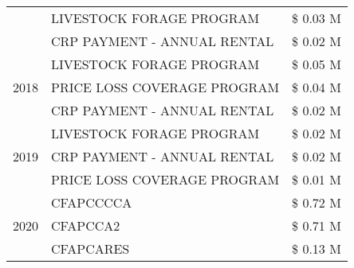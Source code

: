 \begin{tabular}{llr}
 & LIVESTOCK FORAGE PROGRAM & \$ 0.03 M \\
 & CRP PAYMENT - ANNUAL RENTAL & \$ 0.02 M \\
\cline{1-3}
\multirow[t]{3}{*}{2018} & LIVESTOCK FORAGE PROGRAM & \$ 0.05 M \\
 & PRICE LOSS COVERAGE PROGRAM & \$ 0.04 M \\
 & CRP PAYMENT - ANNUAL RENTAL & \$ 0.02 M \\
\cline{1-3}
\multirow[t]{3}{*}{2019} & LIVESTOCK FORAGE PROGRAM & \$ 0.02 M \\
 & CRP PAYMENT - ANNUAL RENTAL & \$ 0.02 M \\
 & PRICE LOSS COVERAGE PROGRAM & \$ 0.01 M \\
\cline{1-3}
\multirow[t]{3}{*}{2020} & CFAPCCCCA & \$ 0.72 M \\
 & CFAPCCA2 & \$ 0.71 M \\
 & CFAPCARES & \$ 0.13 M \\
\cline{1-3}
\bottomrule
\end{tabular}
